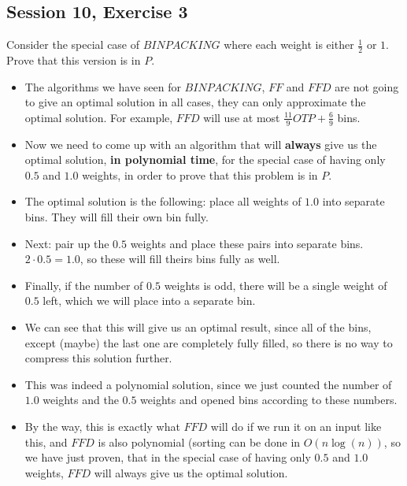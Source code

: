 \subsection {Session 10, Exercise 3}


Consider the special case of $BINPACKING$ where each weight is either $\frac{1}{2}$ or $1$. Prove that this version is in $P$.


\begin{itemize}
    \item The algorithms we have seen for $BINPACKING$, $FF$ and $FFD$ are not going to give an optimal solution in all cases, they can only approximate the optimal solution. For example, $FFD$ will use at most $\frac{11}{9}OTP + \frac{6}{9}$ bins.
    \item Now we need to come up with an algorithm that will \textbf{always} give us the optimal solution, \textbf{in polynomial time}, for the special case of having only $0.5$ and $1.0$ weights, in order to prove that this problem is in $P$.
    \item The optimal solution is the following: place all weights of $1.0$ into separate bins. They will fill their own bin fully.
    \item Next: pair up the $0.5$ weights and place these pairs into separate bins. $2\cdot{}0.5=1.0$, so these will fill theirs bins fully as well.
    \item Finally, if the number of $0.5$ weights is odd, there will be a single weight of $0.5$ left, which we will place into a separate bin.
    \item We can see that this will give us an optimal result, since all of the bins, except (maybe) the last one are completely fully filled, so there is no way to compress this solution further.
    \item This was indeed a polynomial solution, since we just counted the number of $1.0$ weights and the $0.5$ weights and opened bins according to these numbers.
    \item By the way, this is exactly what $FFD$ will do if we run it on an input like this, and $FFD$ is also polynomial (sorting can be done in $O(n\log(n))$, so we have just proven, that in the special case of having only $0.5$ and $1.0$ weights, $FFD$ will always give us the optimal solution.
\end{itemize}

